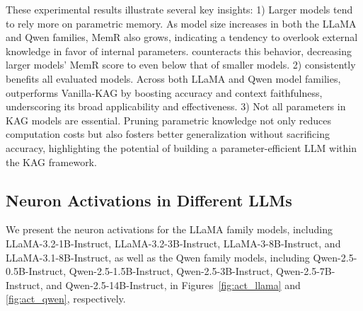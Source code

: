 \begin{table}[!t]
  
  \caption{The total number of parameters for various models before and after applying \method{}. \textcolor{gray}{\small$(\cdot)\%$} represents the proportion relative to the original model, and the last column lists the layers selected for pruning.}
   \label{tab:diff_model_param}
\end{table}

These experimental results illustrate several key insights: 1) Larger models tend to rely more on parametric memory. As model size increases in both the LLaMA and Qwen families, MemR also grows, indicating a tendency to overlook external knowledge in favor of internal parameters. \method{} counteracts this behavior, decreasing larger models' MemR score to even below that of smaller models. 2) \method{} consistently benefits all evaluated models. Across both LLaMA and Qwen model families, \method{} outperforms Vanilla-KAG by boosting accuracy and context faithfulness, underscoring its broad applicability and effectiveness. 3) Not all parameters in KAG models are essential. Pruning parametric knowledge not only reduces computation costs but also fosters better generalization without sacrificing accuracy, highlighting the potential of building a parameter-efficient LLM within the KAG framework.




\begin{table*}[!t]
  
  \caption{Average performance of LLMs on \dataset{} and ConFiQA before and after applying \method{}.}
   \label{tab:append:all_model_res}
\end{table*}

\subsection{Neuron Activations in Different LLMs}\label{app:activation}
We present the neuron activations for the LLaMA family models, including LLaMA-3.2-1B-Instruct, LLaMA-3.2-3B-Instruct, LLaMA-3-8B-Instruct, and LLaMA-3.1-8B-Instruct, as well as the Qwen family models, including Qwen-2.5-0.5B-Instruct, Qwen-2.5-1.5B-Instruct, Qwen-2.5-3B-Instruct, Qwen-2.5-7B-Instruct, and Qwen-2.5-14B-Instruct, in Figures~\ref{fig:act_llama} and \ref{fig:act_qwen}, respectively. 


\begin{figure*}[t]
  \centering
  

 \caption{Neuron activations across different layers of the LLaMA series models. We present the inhibition ratio $\Delta R$ under two conditions: with contextual knowledge input (w/ context) and without it (w/o context).}
 \label{fig:act_llama}
\end{figure*}

